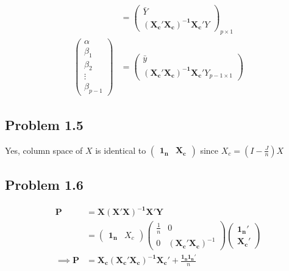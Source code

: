 \documentclass[a4paper]{article}
\begin{document}
\begin{align*}
&= \begin{pmatrix}
\bar{Y}\\
\mathbf{(X_c'X_c)^{-1}X_c}'Y
\end{pmatrix}_{p \times 1}\\
\begin{pmatrix}
\alpha\\
\beta_1\\
\beta_2\\
\vdots\\
\beta_{p-1}\end{pmatrix} &= \begin{pmatrix}
\bar{y}\\
\mathbf{(X_c'X_c)^{-1}X_c}'Y_{p-1\times 1}
\end{pmatrix}
\end{align*}


\subsection*{Problem 1.5}

Yes, column space of $X$ is identical to $\begin{pmatrix}
\mathbf{1_n} & \mathbf{X_c}
\end{pmatrix}$ since $X_c = (I-\frac{J}{n})X$

\subsection*{Problem 1.6}
\begin{align*}
\mathbf{P} &= \mathbf{X(X'X)^{-1}X'Y}\\
&= \begin{pmatrix}
\mathbf{1_n} & X_c
\end{pmatrix} \begin{pmatrix}
\frac{1}{n} & 0\\
0 & (\mathbf{X_c'X_c})^{-1}
\end{pmatrix}\begin{pmatrix}
\mathbf{1_n'}\\
\mathbf{X_c'}
\end{pmatrix}\\
\implies \mathbf{P} &= \mathbf{X_c(X_c'X_c)^{-1}X_c'} + \frac{\mathbf{1_n1_n'}}{n}\\
\end{align*}
\end{document}
